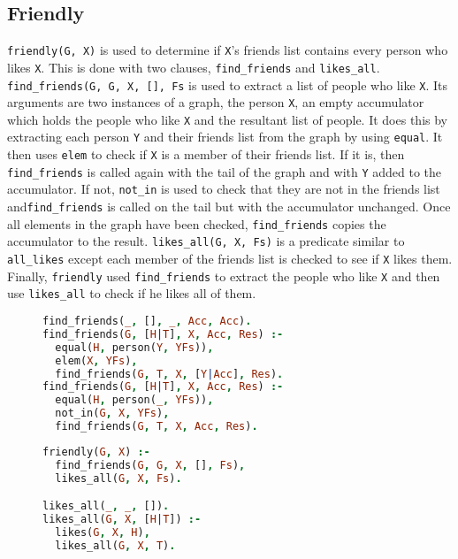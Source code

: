 \documentclass{article}
\begin{document}
\subsection{Friendly}
\texttt{friendly(G, X)} is used to determine if \texttt{X}'s friends list contains every person who likes \texttt{X}. This is done with two clauses, \texttt{find\_friends} and \texttt{likes\_all}. \texttt{find\_friends(G, G, X, [], Fs} is used to extract a list of people who like \texttt{X}. Its arguments are two instances of a graph, the person \texttt{X}, an empty accumulator which holds the people who like \texttt{X} and the resultant list of people. It does this by extracting each person \texttt{Y} and their friends list from the graph by using \texttt{equal}. It then uses \texttt{elem} to check if \texttt{X} is a member of their friends list. If it is, then \texttt{find\_friends} is called again with the tail of the graph and with \texttt{Y} added to the accumulator. If not, \texttt{not\_in} is used to check that they are not in the friends list and\texttt{find\_friends} is called on the tail but with the accumulator unchanged. Once all elements in the graph have been checked, \texttt{find\_friends} copies the accumulator to the result.
\bigbreak
\texttt{likes\_all(G, X, Fs)} is a predicate similar to \texttt{all\_likes} except each member of the friends list is checked to see if \texttt{X} likes them. Finally, \texttt{friendly} used \texttt{find\_friends} to extract the people who like \texttt{X} and then use \texttt{likes\_all} to check if he likes all of them.
\begin{figure}[h!]
\begin{minipage}{0.6\textwidth}
\begin{lstlisting}[language=Prolog]
find_friends(_, [], _, Acc, Acc).
find_friends(G, [H|T], X, Acc, Res) :-
  equal(H, person(Y, YFs)),
  elem(X, YFs),                        
  find_friends(G, T, X, [Y|Acc], Res). 
find_friends(G, [H|T], X, Acc, Res) :-
  equal(H, person(_, YFs)),
  not_in(G, X, YFs),                   
  find_friends(G, T, X, Acc, Res).     
\end{lstlisting}
\end{minipage}
\begin{minipage}{0.4\textwidth}
\begin{lstlisting}[language=Prolog]
friendly(G, X) :-
  find_friends(G, G, X, [], Fs),
  likes_all(G, X, Fs).

likes_all(_, _, []).
likes_all(G, X, [H|T]) :-
  likes(G, X, H),
  likes_all(G, X, T).
\end{lstlisting}
\end{minipage}
\end{figure}
\end{document}
